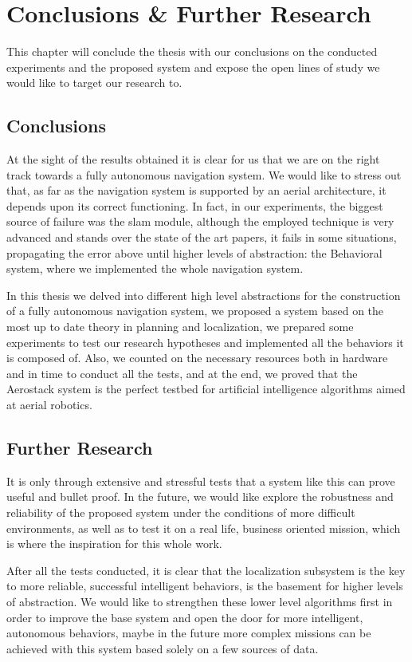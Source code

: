 \chapter{Conclusions \& Further Research}

This chapter will conclude the thesis with our conclusions on the conducted experiments and the proposed system and expose the open lines of study we would like to target our research to. 

\section{Conclusions} \label{ch_6:sect:conclusions}

  At the sight of the results obtained it is clear for us that we are on the right track towards a fully autonomous navigation system. We would like to stress out that, as far as the navigation system is supported by an aerial architecture, it depends upon its correct functioning. In fact, in our experiments, the biggest source of failure was the slam module, although the employed technique is very advanced and stands over the state of the art papers, it fails in some situations, propagating the error above until higher levels of abstraction: the Behavioral system, where we implemented the whole navigation system.

  In this thesis we delved into different high level abstractions for the construction of a fully autonomous navigation system, we proposed a system based on the most up to date theory in planning and localization, we prepared some experiments to test our research hypotheses and implemented all the behaviors it is composed of. Also, we counted on the necessary resources both in hardware and in time to conduct all the tests, and at the end, we proved that the Aerostack system is the perfect testbed for artificial intelligence algorithms aimed at aerial robotics.

\pagebreak

\section{Further Research} \label{ch_6:sect:research}

  It is only through extensive and stressful tests that a system like this can prove useful and bullet proof. In the future, we would like explore the robustness and reliability of the proposed system under the conditions of more difficult environments, as well as to test it on a real life, business oriented mission, which is where the inspiration for this whole work.

  After all the tests conducted, it is clear that the localization subsystem is the key to more reliable, successful intelligent behaviors, is the basement for higher levels of abstraction. We would like to strengthen these lower level algorithms first in order to improve the base system and open the door for more intelligent, autonomous behaviors, maybe in the future more complex missions can be achieved with this system based solely on a few sources of data.
